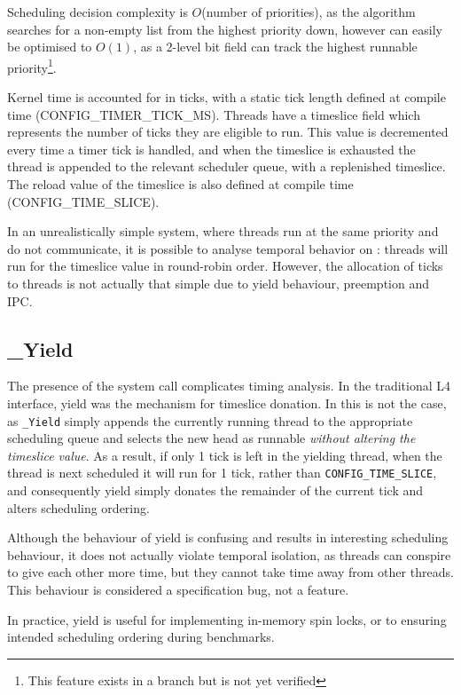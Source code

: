 Scheduling decision complexity is $O$(number of priorities), as the algorithm searches for a non-empty list from the highest priority down, however can easily be optimised to $O(1)$, as a 2-level bit field can track the highest runnable priority\footnote{This feature exists in a branch but is not yet verified}. 

Kernel time is accounted for in ticks, with a static tick length defined at compile time (CONFIG\_TIMER\_TICK\_MS).
Threads have a timeslice field which represents the number of ticks they are eligible to run. 
This value is decremented every time a timer tick is handled, and when the timeslice is exhausted the thread is appended to the relevant scheduler queue, with a replenished timeslice.
The reload value of the timeslice is also defined at compile time (CONFIG\_TIME\_SLICE).

In an unrealistically simple system, where threads run at the same priority and do not communicate, it is possible to analyse temporal behavior on \selfour: threads will run for the timeslice value in round-robin order.
However, the allocation of ticks to threads is not actually that simple due to yield behaviour, preemption and \gls{IPC}. 

\subsection{\selfour\_Yield}

The presence of the \yield system call complicates timing analysis.
In the traditional L4 interface, yield was the mechanism for timeslice donation. 
In \selfour this is not the case, as \texttt{\selfour\_Yield} simply appends the currently running thread to the appropriate scheduling queue and selects the new head as runnable \textit{without altering the timeslice value}.
As a result, if only 1 tick is left in the yielding thread, when the thread is next scheduled it will run for 1 tick, rather than \texttt{CONFIG\_TIME\_SLICE}, and consequently yield simply donates the remainder of the current tick and alters scheduling ordering.

Although the behaviour of yield is confusing and results in interesting scheduling behaviour, it does not actually violate temporal isolation, as threads can conspire to give each other more time, but they cannot take time away from other threads.
This behaviour is considered a specification bug, not a feature. 

In practice, yield is useful for implementing in-memory spin locks, or to ensuring intended scheduling ordering during benchmarks.

